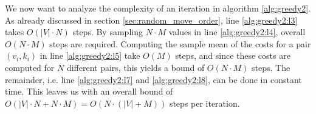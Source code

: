 We now want to analyze the complexity of an iteration in algorithm \ref{alg:greedy2}. As already discussed in section \ref{sec:random_move_order}, line \ref{alg:greedy2:l3} takes $O(|V|\cdot N)$ steps. By sampling $N \cdot M$ values in line \ref{alg:greedy2:l4}, overall $O(N \cdot M)$ steps are required. Computing the sample mean of the costs for a pair $(v_i,k_i)$ in line \ref{alg:greedy2:l5} take $O(M)$ steps, and since these costs are computed for $N$ different pairs, this yields a bound of $O(N \cdot M)$ steps. The remainder, i.e. line \ref{alg:greedy2:l7} and \ref{alg:greedy2:l8}, can be done in constant time. This leaves us with an overall bound of $O(|V|\cdot N + N \cdot M ) = O(N\cdot (|V|+M))$ steps per iteration.